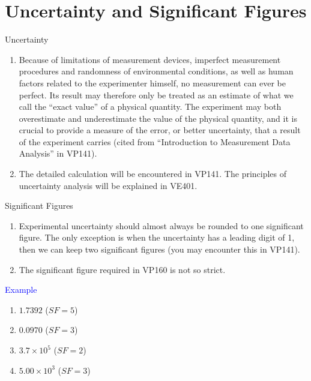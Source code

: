 \documentclass{beamer}
\begin{document}
\section{Uncertainty and Significant Figures}
\begin{frame}{Uncertainty}
  \begin{enumerate}
    \item Because of limitations of measurement devices, imperfect
    measurement procedures and randomness of environmental
    conditions, as well as human factors related to the experimenter
    himself, no measurement can ever be perfect. Its result may therefore
    only be treated as an estimate of what we call the ``exact value” of a
    physical quantity. The experiment may both overestimate and
    underestimate the value of the physical quantity, and it is crucial to
    provide a measure of the error, or better uncertainty, that a result of
    the experiment carries (cited from ``Introduction to Measurement
    Data Analysis” in VP141).
    \item The detailed calculation will be encountered in VP141. The principles of uncertainty analysis will be explained in VE401.
  \end{enumerate}
\end{frame}

\begin{frame}{Significant Figures} 
    \begin{enumerate}
      \item Experimental uncertainty should almost always be rounded to one significant figure. The only exception is when the uncertainty has a leading digit of 1, then we can keep two significant figures (you may encounter this in VP141).
      \item The significant figure required in VP160 is not so strict.
    \end{enumerate} 
    \textcolor{blue}{Example}
    \begin{enumerate}
      \item $1.7392$ ($SF = 5$)
      \item $0.0970$ ($SF = 3$)
      \item $3.7\times 10^5$ ($SF = 2$)
      \item $5.00\times 10^3$ ($SF = 3$)
    \end{enumerate}
\end{frame}
\end{document}
